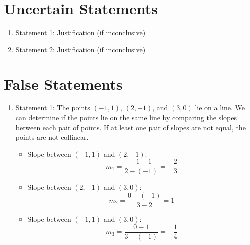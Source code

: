 \documentclass{article}
\begin{document}
\section{Uncertain Statements}

\begin{enumerate}
    \item Statement 1: Justification (if inconclusive)
    \item Statement 2: Justification (if inconclusive)
\end{enumerate}

\section{False Statements}

\begin{enumerate}
    \item Statement 1: The points $(-1,1)$, $(2,-1)$, and $(3,0)$ lie on a line.\newline
          We can determine if the points lie on the same line by comparing the slopes between each pair of points.
          If at least one pair of slopes are not equal, the points are not collinear.

          \begin{itemize}
              \item Slope between \((-1, 1)\) and \((2, -1)\):
                    \[
                        m_1 = \frac{-1 - 1}{2 - (-1)} = -\frac{2}{3}
                    \]

              \item Slope between \((2, -1)\) and \((3, 0)\):
                    \[
                        m_2 = \frac{0 - (-1)}{3 - 2} = 1
                    \]

              \item Slope between \((-1, 1)\) and \((3, 0)\):
                    \[
                        m_3 = \frac{0 - 1}{3 - (-1)} = -\frac{1}{4}
                    \]
          \end{itemize}


\end{enumerate}
\end{document}
